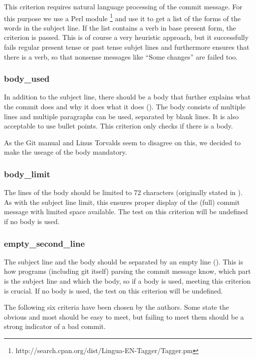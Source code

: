 This criterion requires natural language processing of the commit
message. For this purpose we use a Perl module \footnote{http://search.cpan.org/dist/Lingua-EN-Tagger/Tagger.pm} and use it to get a list of the forms of the words in the subject line. If the list contains a verb in base present form, the criterion is passed. This is of course a very heuristic approach, but it successfully fails regular present tense or past tense subjet lines and furthermore ensures that there is a verb, so that nonsense messages like ``Some changes'' are failed too.

\subsubsection{body\_used}
\label{subs:body_used}
In addition to the subject line, there should be a body that further explains what the commit does and why it does what it does (\cite{OffGuide}). The body consists of multiple lines and multiple paragraphs can be used, separated by blank lines. It is also acceptable to use bullet points. This criterion only checks if there is a body.

As the Git manual \cite{OffGuide} and Linus Torvalds \cite{SR} seem to disagree on this, we decided to make the useage of the body mandatory.

\subsubsection{body\_limit}
\label{subs:body_limit}
The lines of the body should be limited to 72 characters (originally stated in \cite{TP}). As with the subject line limit, this ensures proper display of the (full) commit message with limited space available. The test on this criterion will be undefined if no body is used.

\subsubsection{empty\_second\_line}
\label{subs:empty_second_line}
The subject line and the body should be separated by an empty line (\cite{TP}). This is how programs (including git itself) parsing the commit message know, which part is the subject line and which the body, so if a body is used, meeting this criterion is crucial. If no body is used, the test on this criterion will be undefined.

The following six criteria have been chosen by the authors. Some state the obvious and most should be easy to meet, but failing to meet them should be a strong indicator of a bad commit.

